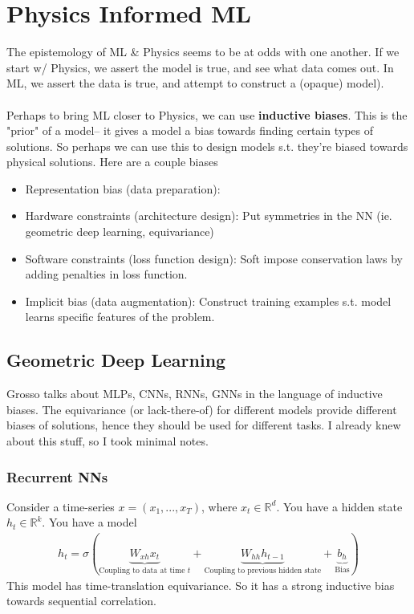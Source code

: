 \section{Physics Informed ML}
The epistemology of ML \& Physics seems to be at odds with one another. If we start w/ Physics, we assert the model is true, and see what data comes out. In ML, we assert the data is true, and attempt to construct a (opaque) model).\\
\\
Perhaps to bring ML closer to Physics, we can use \textbf{inductive biases}. This is the "prior" of a model-- it gives a model a bias towards finding certain types of solutions. So perhaps we can use this to design models s.t. they're biased towards physical solutions. Here are a couple biases
\begin{itemize}
	\item Representation bias (data preparation):
	\item Hardware constraints (architecture design): Put symmetries in the NN (ie. geometric deep learning, equivariance)
	\item Software constraints (loss function design): Soft impose conservation laws by adding penalties in loss function.
	\item Implicit bias (data augmentation): Construct training examples s.t. model learns specific features of the problem.
\end{itemize}
\subsection{Geometric Deep Learning}
Grosso talks about MLPs, CNNs, RNNs, GNNs in the language of inductive biases. The equivariance (or lack-there-of) for different models provide different biases of solutions, hence they should be used for different tasks. I already knew about this stuff, so I took minimal notes.

\subsubsection{Recurrent NNs}
Consider a time-series $x = (x_1,..., x_T)$, where $x_t \in \mathbb R^d$. You have a hidden state $h_t \in \mathbb R^k$. You have a model
\begin{align}
	h_t = \sigma(\underbrace{W_{x h} x_t}_{\text{Coupling to data at time $t$}} + \underbrace{W_{hh} h_{t-1}}_{\text{Coupling to previous hidden state}} + \underbrace{b_h}_{\text{Bias}})
\end{align}
This model has time-translation equivariance. So it has a strong inductive bias towards sequential correlation.

